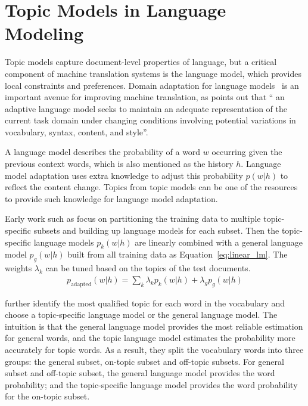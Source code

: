 \section{Topic Models in Language Modeling}

Topic models capture document-level properties of language, but a critical component of machine translation systems is the language model, which provides local constraints and preferences. Domain adaptation for language models~\citep{Bellegarda-04,wood-09} is an important avenue for improving machine translation, as \citet{Bellegarda-04} points out that `` an adaptive language model seeks to maintain an adequate representation of the current task domain under changing conditions involving potential variations in vocabulary, syntax, content, and style''.

A language model describes the probability of a word $w$ occurring given the previous context words, which is also mentioned as the history $h$. Language model adaptation uses extra knowledge to adjust this probability $p(w|h)$ to reflect the content change. Topics from topic models can be one of the resources to provide such knowledge for language model adaptation.

Early work such as \citet{Clarkson-1997,Seymore-1997,Kneser-1997,Iyer-1999} focus on partitioning the training data to multiple topic-specific subsets and building up language models for each subset. Then the topic-specific language models $p_k(w|h)$ are linearly combined with a general language model $p_g(w|h)$ built from all training data as Equation~\ref{eq:linear_lm}. The weights $\lambda_k$ can be tuned based on the topics of the test documents. 
\begin{align}
\label{eq:linear_lm}
p_\textrm{adapted}(w|h) = \sum_k \lambda_k p_k(w|h) + \lambda_g p_g(w|h)
\end{align} 

\citet{Seymore-1998} further identify the most qualified topic for each word in the vocabulary and choose a topic-specific language model or the general language model. The intuition is that the general language model provides the most reliable estimation for general words, and the topic language model estimates the probability more accurately for topic words. As a result, they split the vocabulary words into three groups: the general subset, on-topic subset and off-topic subsets. For general subset and off-topic subset, the general language model provides the word probability; and the topic-specific language model provides the word probability for the on-topic subset. 

